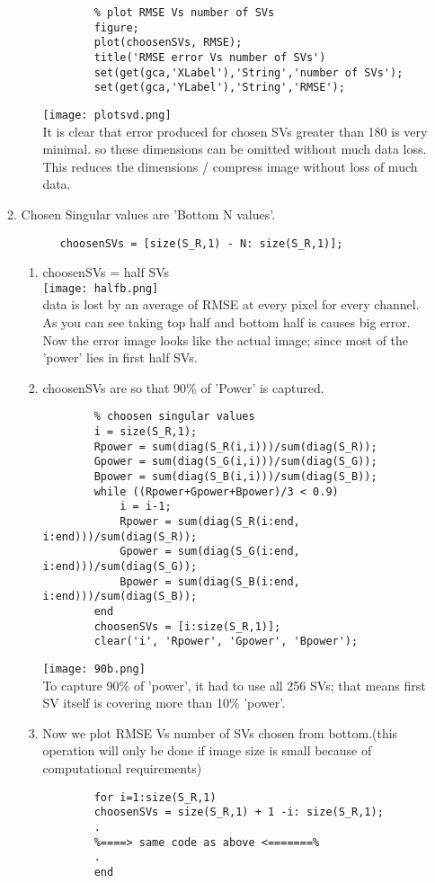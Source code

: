 \documentclass{article}
\begin{document}
\begin{enumerate}
\begin{enumerate}
\begin{enumerate}
\begin{lstlisting}
        % plot RMSE Vs number of SVs
        figure;
        plot(choosenSVs, RMSE);
        title('RMSE error Vs number of SVs')
        set(get(gca,'XLabel'),'String','number of SVs');
        set(get(gca,'YLabel'),'String','RMSE');
      \end{lstlisting}
      \texttt{[image: plotsvd.png]}\\
      It is clear that error produced for chosen SVs greater than 180 is very minimal. so these dimensions can be omitted without much data loss. This reduces the dimensions / compress image without loss of much data.
    \end{enumerate}
    \newpage
    \item Chosen Singular values are 'Bottom N values'.
     \begin{lstlisting}
      choosenSVs = [size(S_R,1) - N: size(S_R,1)];
    \end{lstlisting}
    \begin{enumerate}
      \item choosenSVs = half SVs\\
      \texttt{[image: halfb.png]}\\
      data is lost by an average of RMSE at every pixel for every channel. As you can see taking top half and bottom half is causes big error. Now the error image looks like the actual image; since most of the 'power' lies in first half SVs.\\
      \item choosenSVs are so that 90\% of 'Power' is captured.\\
      \begin{lstlisting}
        % choosen singular values
        i = size(S_R,1);
        Rpower = sum(diag(S_R(i,i)))/sum(diag(S_R));
        Gpower = sum(diag(S_G(i,i)))/sum(diag(S_G));
        Bpower = sum(diag(S_B(i,i)))/sum(diag(S_B));
        while ((Rpower+Gpower+Bpower)/3 < 0.9)
            i = i-1;
            Rpower = sum(diag(S_R(i:end, i:end)))/sum(diag(S_R));
            Gpower = sum(diag(S_G(i:end, i:end)))/sum(diag(S_G));
            Bpower = sum(diag(S_B(i:end, i:end)))/sum(diag(S_B));
        end
        choosenSVs = [i:size(S_R,1)];
        clear('i', 'Rpower', 'Gpower', 'Bpower');

      \end{lstlisting}
      \texttt{[image: 90b.png]}\\
      To capture 90\% of 'power', it had to use all 256 SVs; that means first SV itself is covering more than 10\% 'power'.
      \item Now we plot RMSE Vs number of SVs chosen from bottom.(this operation will only be done if image size is small because of computational requirements)
      \begin{lstlisting}
        for i=1:size(S_R,1)
        choosenSVs = size(S_R,1) + 1 -i: size(S_R,1);
        .
        %====> same code as above <=======%
        .
        end


\end{lstlisting}
\end{enumerate}
\end{enumerate}
\end{enumerate}
\end{document}
